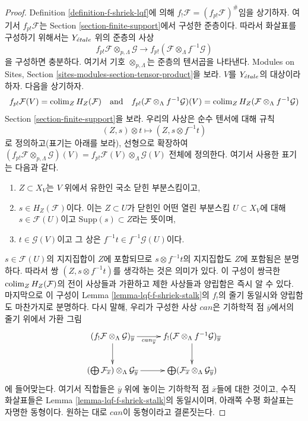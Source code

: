 \begin{proof}
Definition \ref{definition-f-shriek-lqf}에 의해
$f_!\mathcal{F} = (f_{p!}\mathcal{F})^\#$임을 상기하자. 여기서
$f_{p!}\mathcal{F}$는 Section \ref{section-finite-support}에서 구성한
준층이다. 따라서 화살표를 구성하기 위해서는 $Y_{\acute{e}tale}$ 위의 준층의
사상
$$
f_{p!}\mathcal{F} \otimes_{p, \Lambda} \mathcal{G}
\longrightarrow
f_{p!}(\mathcal{F} \otimes_\Lambda f^{-1}\mathcal{G})
$$
을 구성하면 충분하다. 여기서 기호 $\otimes_{p, \Lambda}$는 준층의
텐서곱을 나타낸다. Modules on Sites, Section
\ref{sites-modules-section-tensor-product}을 보라.
$V$를 $Y_{\acute{e}tale}$의 대상이라 하자. 다음을 상기하자.
$$
f_{p!}\mathcal{F}(V) = \mathop{\mathrm{colim}}\nolimits_Z H_Z(\mathcal{F})
\quad\text{and}\quad
f_{p!}(\mathcal{F} \otimes_\Lambda f^{-1}\mathcal{G})(V) =
\mathop{\mathrm{colim}}\nolimits_Z H_Z(\mathcal{F} \otimes_\Lambda f^{-1}\mathcal{G})
$$
Section \ref{section-finite-support}을 보라. 우리의 사상은 순수 텐서에
대해 규칙
$$
(Z, s) \otimes t \longmapsto (Z, s \otimes f^{-1}t)
$$
로 정의하고(표기는 아래를 보라), 선형으로 확장하여
$(f_{p!}\mathcal{F} \otimes_{p, \Lambda} \mathcal{G})(V) =
f_{p!}\mathcal{F}(V) \otimes_\Lambda \mathcal{G}(V)$ 전체에 정의한다.
여기서 사용한 표기는 다음과 같다.
\begin{enumerate}
\item $Z \subset X_V$는 $V$ 위에서 유한인 국소 닫힌 부분스킴이고,
\item $s \in H_Z(\mathcal{F})$이다. 이는 $Z \subset U$가 닫힌인 어떤
열린 부분스킴 $U \subset X_V$에 대해 $s \in \mathcal{F}(U)$이고
$\text{Supp}(s) \subset Z$라는 뜻이며,
\item $t \in \mathcal{G}(V)$이고 그 상은
$f^{-1}t \in f^{-1}\mathcal{G}(U)$이다.
\end{enumerate}
$s \in \mathcal{F}(U)$의 지지집합이 $Z$에 포함되므로
$s \otimes f^{-1}t$의 지지집합도 $Z$에 포함됨은 분명하다.
따라서 쌍 $(Z, s \otimes f^{-1}t)$를 생각하는 것은 의미가 있다.
이 구성이 쌍극한 $\mathop{\mathrm{colim}}\nolimits_Z H_Z(\mathcal{F})$의 전이 사상들과 가환하고
제한 사상들과 양립함은 즉시 알 수 있다. 마지막으로 이 구성이
Lemma \ref{lemma-lqf-f-shriek-stalk}의 $f_!$의 줄기 동일시와
양립함도 마찬가지로 분명하다. 다시 말해, 우리가 구성한 사상 $can$은
기하학적 점 $\overline{y}$에서의 줄기 위에서 가환 그림
$$
\xymatrix{
(f_!\mathcal{F} \otimes_\Lambda \mathcal{G})_{\overline{y}}
\ar[r]_-{can_{\overline{y}}} \ar[d] &
f_!(\mathcal{F} \otimes_\Lambda f^{-1}\mathcal{G})_{\overline{y}} \ar[d] \\
(\bigoplus \mathcal{F}_{\overline{x}})
\otimes_\Lambda \mathcal{G}_{\overline{y}} \ar[r] &
\bigoplus
(\mathcal{F}_{\overline{x}} \otimes_\Lambda \mathcal{G}_{\overline{y}})
}
$$
에 들어맞는다. 여기서 직합들은 $\overline{y}$ 위에 놓이는 기하학적 점
$\overline{x}$들에 대한 것이고, 수직 화살표들은 Lemma
\ref{lemma-lqf-f-shriek-stalk}의 동일시이며, 아래쪽 수평 화살표는
자명한 동형이다. 원하는 대로 $can$이 동형이라고 결론짓는다.
\end{proof}

